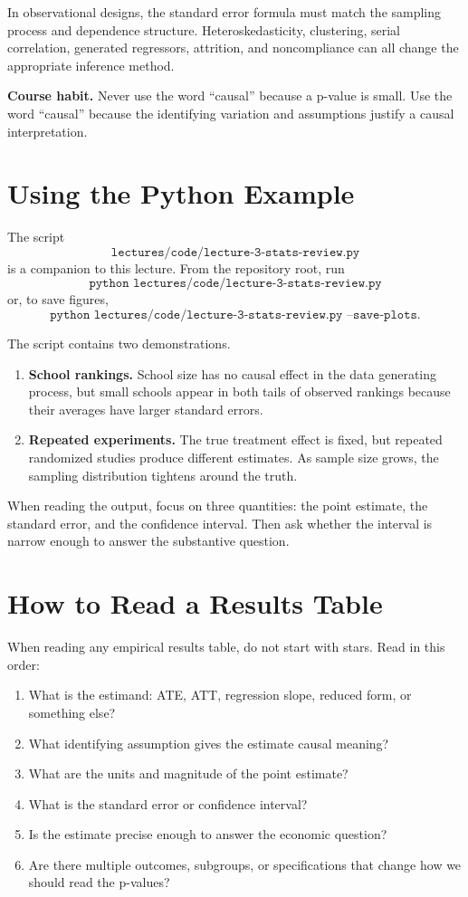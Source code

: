 In observational designs, the standard error formula must match the sampling
process and dependence structure. Heteroskedasticity, clustering, serial
correlation, generated regressors, attrition, and noncompliance can all change
the appropriate inference method.

\begin{boxF}
\textbf{Course habit.} Never use the word ``causal'' because a p-value is
small. Use the word ``causal'' because the identifying variation and
assumptions justify a causal interpretation.
\end{boxF}

\section{Using the Python Example}

The script
\[
  \texttt{lectures/code/lecture-3-stats-review.py}
\]
is a companion to this lecture. From the repository root, run
\[
  \texttt{python lectures/code/lecture-3-stats-review.py}
\]
or, to save figures,
\[
  \texttt{python lectures/code/lecture-3-stats-review.py --save-plots}.
\]

The script contains two demonstrations.
\begin{enumerate}
  \item \textbf{School rankings.} School size has no causal effect in the data
  generating process, but small schools appear in both tails of observed
  rankings because their averages have larger standard errors.
  \item \textbf{Repeated experiments.} The true treatment effect is fixed, but
  repeated randomized studies produce different estimates. As sample size
  grows, the sampling distribution tightens around the truth.
\end{enumerate}

When reading the output, focus on three quantities: the point estimate, the
standard error, and the confidence interval. Then ask whether the interval is
narrow enough to answer the substantive question.

\section{How to Read a Results Table}

When reading any empirical results table, do not start with stars. Read in this
order:
\begin{enumerate}
  \item What is the estimand: ATE, ATT, regression slope, reduced form, or
  something else?
  \item What identifying assumption gives the estimate causal meaning?
  \item What are the units and magnitude of the point estimate?
  \item What is the standard error or confidence interval?
  \item Is the estimate precise enough to answer the economic question?
  \item Are there multiple outcomes, subgroups, or specifications that change
  how we should read the p-values?
\end{enumerate}

